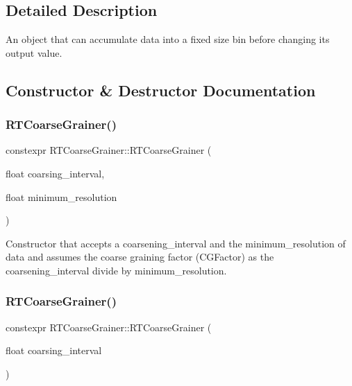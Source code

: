 \subsection{Detailed Description}
An object that can accumulate data into a fixed size bin before changing its output value. 

\subsection{Constructor \& Destructor Documentation}
\mbox{\label{classRTCoarseGrainer_a67187c9ba3d8142c23379392dec4e35d}} 
\subsubsection{\texorpdfstring{R\+T\+Coarse\+Grainer()}{RTCoarseGrainer()}\hspace{0.1cm}{\footnotesize\ttfamily [1/2]}}
{\footnotesize\ttfamily constexpr R\+T\+Coarse\+Grainer\+::\+R\+T\+Coarse\+Grainer (\begin{DoxyParamCaption}\item[{float}]{coarsing\+\_\+interval,  }\item[{float}]{minimum\+\_\+resolution }\end{DoxyParamCaption})\hspace{0.3cm}{\ttfamily [inline]}}



Constructor that accepts a {\ttfamily coarsening\+\_\+interval} and the {\ttfamily minimum\+\_\+resolution} of data and assumes the coarse graining factor ({\ttfamily C\+G\+Factor}) as the {\ttfamily coarsening\+\_\+interval} divide by {\ttfamily minimum\+\_\+resolution}. 

\mbox{\label{classRTCoarseGrainer_af46c3757bdda8ce79f8655d5556d845b}} 
\subsubsection{\texorpdfstring{R\+T\+Coarse\+Grainer()}{RTCoarseGrainer()}\hspace{0.1cm}{\footnotesize\ttfamily [2/2]}}
{\footnotesize\ttfamily constexpr R\+T\+Coarse\+Grainer\+::\+R\+T\+Coarse\+Grainer (\begin{DoxyParamCaption}\item[{float}]{coarsing\+\_\+interval }\end{DoxyParamCaption})\hspace{0.3cm}{\ttfamily [inline]}}



